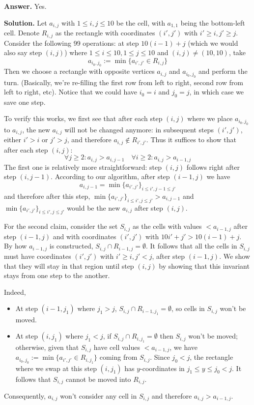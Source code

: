 \documentclass[11pt,a4paper]{article}
\begin{document}
\begin{enumerate}
	\textbf{Answer.} Yes. 
	
	\textbf{Solution.} 
	Let $a_{i, j}$ with $1\le i, j\le 10$ be the cell, with $a_{1, 1}$ being the bottom-left cell. 
	Denote $R_{i, j}$ as the rectangle with coordinates $(i', j')$ with $i'\ge i, j'\ge j$. 
	Consider the following 99 operations: 
	at step $10(i-1)+j$ (which we would also say step $(i, j)$) where $1\le i\le 10, 1\le j\le 10$ and $(i, j)\neq (10, 10)$, 
	take 
	\[a_{i_0, j_0} := \min\{a_{i', j'}\in R_{i, j}\}
	\]
	Then we choose a rectangle with opposite vertices $a_{i, j}$ and $a_{i_0, j_0}$ and perform the turn. 
	(Basically, we're re-filling the first row from left to right, second row from left to right, etc). 
	Notice that we could have $i_0=i$ and $j_0=j$, in which case we save one step. 
	
	To verify this works, we first see that after each step $(i, j)$ where we place $a_{i_0, j_0}$ to $a_{i, j}$, 
	the new $a_{i, j}$ will not be changed anymore: in subsequent steps $(i', j')$, 
	either $i'>i$ or $j'>j$, and therefore $a_{i, j}\not\in R_{i', j'}$. 
	Thus it suffices to show that after each step $(i, j)$: 
	\[
	\forall j\ge 2: a_{i, j} > a_{i, j - 1}
	\quad 
	\forall i\ge 2: a_{i, j} > a_{i-1, j}
	\]
	The first one is relatively more straightforward: step $(i, j)$ follows right after step $(i, j-1)$. 
	According to our algorithm, after step $(i-1, j)$ we have 
	\[
	a_{i, j-1} = \min\{a_{i', j'}\}_{i\le i', j-1\le j'}
	\]
	and therefore after this step, $\min\{a_{i', j'}\}_{i\le i', j\le j'} > a_{i, j-1}$
	and $\min\{a_{i', j'}\}_{i\le i', j\le j'}$ would be the new $a_{i, j}$ after step $(i, j)$. 
	
	For the second claim, consider the set $S_{i, j}$ as the cells with values $<a_{i-1, j}$ after step $(i-1, j)$
	and with coordinates $(i', j')$ with $10i'+j'>10(i-1)+j$. 
	By how $a_{i-1, j}$ is constructed, $S_{i, j}\cap R_{i-1, j}=\emptyset$. 
	It follows that all the cells in $S_{i, j}$ must have coordinates $(i', j')$ with $i'\ge i, j'<j$, 
	after step $(i-1, j)$. 
	We show that they will stay in that region until step $(i, j)$ by showing that this invariant stays from one step to the another. 
	
	Indeed, 
	\begin{itemize}
		\item At step $(i-1, j_1)$ where $j_1>j$, $S_{i, j}\cap R_{i-1, j_1}=\emptyset$, so cells in $S_{i, j}$ won't be moved. 
		
		\item At step $(i, j_1)$ where $j_1<j$, if $S_{i, j}\cap R_{i, j_1}=\emptyset$ then $S_{i, j}$ won't be moved; 
		otherwise, given that $S_{i, j}$ have cell values $<a_{i-1, j}$, 
		we have $a_{i_0, j_0}:=\min\{a_{i', j'}\in R_{i, j_1}\}$ coming from $S_{i, j}$. 
		Since $j_0<j$, the rectangle where we swap at this step $(i, j_1)$ has $y$-coordinates in $j_1\le y\le j_0<j$. 
		It follows that $S_{i, j}$ cannot be moved into $R_{i, j}$. 
	\end{itemize}
	Consequently, $a_{i, j}$ won't consider any cell in $S_{i, j}$ and therefore $a_{i, j}>a_{i-1, j}$. 
	

\end{enumerate}
\end{document}
